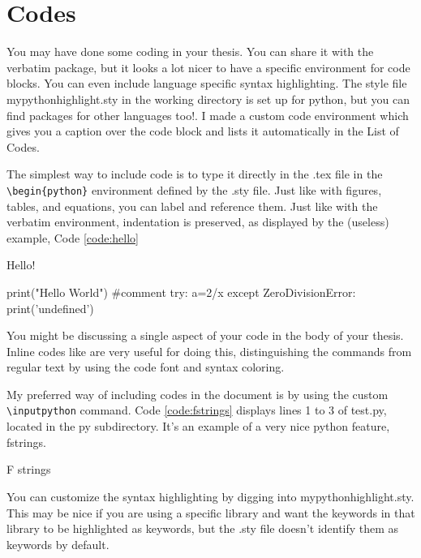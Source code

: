 \chapter{Codes}
You may have done some coding in your thesis. You can share it with the verbatim package, but it looks a lot nicer to have a specific environment for code blocks. You can even include language specific syntax highlighting. The style file mypythonhighlight.sty in the working directory is set up for python, but you can find packages for other languages too!. I made a custom code environment which gives you a caption over the code block and lists it automatically in the List of Codes. 

The simplest way to include code is to type it directly in the .tex file in the \verb=\begin{python}= environment defined by the .sty file. Just like with figures, tables, and equations, you can label and reference them. Just like with the verbatim environment, indentation is preserved, as displayed by the (useless) example, Code \ref{code:hello}

\begin{code}\caption{Hello!} \begin{python}
    print("Hello World") #comment
    try:
        a=2/x
    except ZeroDivisionError:
        print('undefined')
\end{python}\label{code:hello}\end{code}

You might be discussing a single aspect of your code in the body of your thesis. Inline codes like  are very useful for doing this, distinguishing the commands from regular text by using the code font and syntax coloring.

My preferred way of including codes in the document is by using the custom \verb=\inputpython= command. Code \ref{code:fstrings} displays lines 1 to 3 of test.py, located in the py subdirectory. It's an example of a very nice python feature, fstrings. 

\begin{code}\caption{F strings}
\label{code:fstrings}\end{code}

You can customize the syntax highlighting by digging into mypythonhighlight.sty. This may be nice if you are using a specific library and want the keywords in that library to be highlighted as keywords, but the .sty file doesn't identify them as keywords by default.